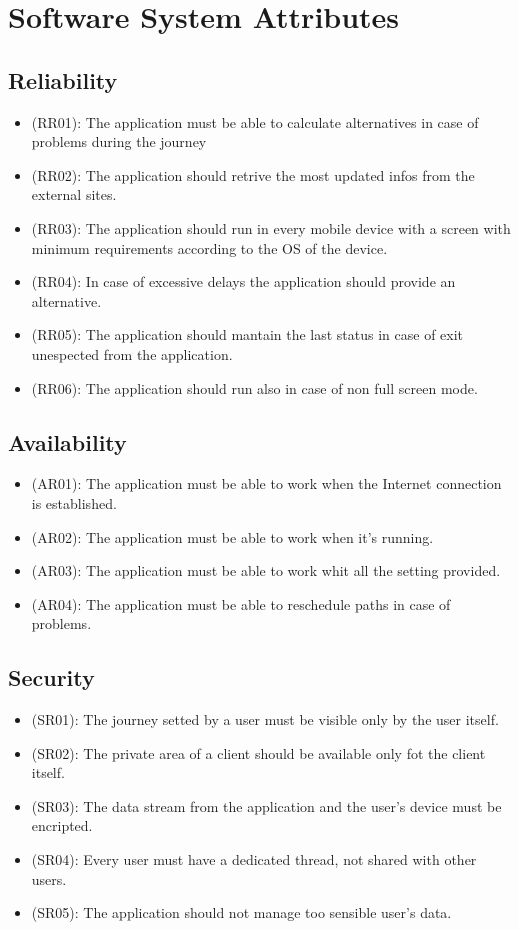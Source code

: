\documentclass[a4paper]{book}
\begin{document}
\section{Software System Attributes}

\subsection{Reliability}
\begin{itemize}
\item (RR01): The application must be able to calculate alternatives in case of problems during the journey
\item (RR02): The application should retrive the most updated infos from the external sites.
\item (RR03): The application should run in every mobile device with a screen with minimum requirements according to the OS of the device.
\item (RR04): In case of excessive delays the application should provide an alternative.
\item (RR05): The application should mantain the last status in case of exit unespected from the application.
\item (RR06): The application should run also in case of non full screen mode.
\end{itemize}

\subsection{Availability}
\begin{itemize}
\item (AR01): The application must be able to work when the Internet connection is established.
\item (AR02): The application must be able to work when it's running.
\item (AR03): The application must be able to work whit all the setting provided.
\item (AR04): The application must be able to reschedule paths in case of problems.
\end{itemize}

\subsection{Security}
\begin{itemize}
\item (SR01): The journey setted by a user must be visible only by the user itself.
\item (SR02): The private area of a client should be available only fot the client itself.
\item (SR03): The data stream from the application and the user's device must be encripted.
\item (SR04): Every user must have a dedicated thread, not shared with other users.
\item (SR05): The application should not manage too sensible user's data.
\end{itemize}
\end{document}
